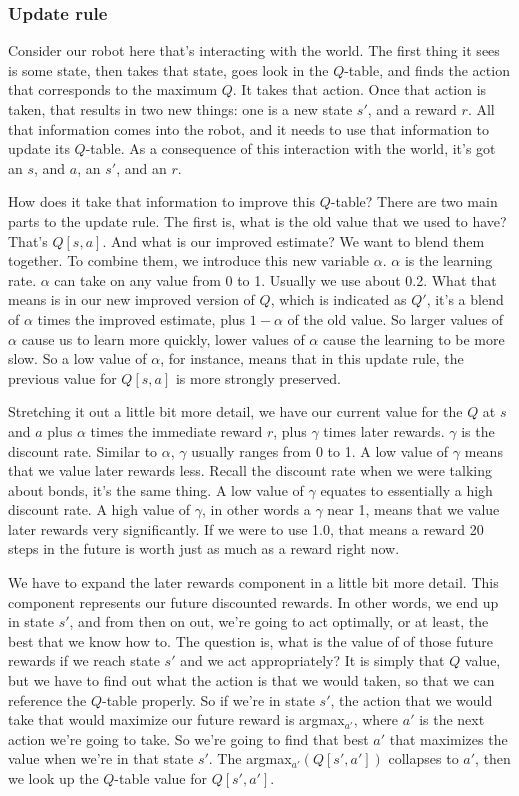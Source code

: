 \documentclass[12pt]{article}
\begin{document}
\subsubsection{Update rule}

Consider our robot here that's interacting with the world. The first thing it sees is some state, then takes that state, goes look in the $Q$-table, and finds the action that corresponds to the maximum $Q$. It takes that action. Once that action is taken, that results in two new things: one is a new state $s'$, and a reward $r$. All that information comes into the robot, and it needs to use that information to update its $Q$-table. As a consequence of this interaction with the world, it's got an $s$, and $a$, an $s'$, and an $r$.

How does it take that information to improve this $Q$-table? There are two main parts to the update rule. The first is, what is the old value that we used to have? That's $Q[s, a]$. And what is our improved estimate? We want to blend them together. To combine them, we introduce this new variable $\alpha$. $\alpha$ is the learning rate. $\alpha$ can take on any value from 0 to 1. Usually we use about 0.2. What that means is in our new improved version of $Q$, which is indicated as $Q'$, it's a blend of $\alpha$ times the improved estimate, plus $1-\alpha$ of the old value. So larger values of $\alpha$ cause us to learn more quickly, lower values of $\alpha$ cause the learning to be more slow. So a low value of $\alpha$, for instance, means that in this update rule, the previous value for $Q[s, a]$ is more strongly preserved. 

Stretching it out a little bit more detail, we have our current value for the $Q$ at $s$ and $a$ plus $\alpha$ times the immediate reward $r$, plus $\gamma$ times later rewards. $\gamma$ is the discount rate. Similar to $\alpha$, $\gamma$ usually ranges from 0 to 1. A low value of $\gamma$ means that we value later rewards less. Recall the discount rate when we were talking about bonds, it's the same thing. A low value of $\gamma$ equates to essentially a high discount rate. A high value of $\gamma$, in other words a $\gamma$ near 1, means that we value later rewards very significantly. If we were to use 1.0, that means a reward 20 steps in the future is worth just as much as a reward right now. 

We have to expand the later rewards component in a little bit more detail. This component represents our future discounted rewards. In other words, we end up in state $s'$, and from then on out, we're going to act optimally, or at least, the best that we know how to. The question is, what is the value of of those future rewards if we reach state $s'$ and we act appropriately? It is simply that $Q$ value, but we have to find out what the action is that we would taken, so that we can reference the $Q$-table properly. So if we're in state $s'$, the action that we would take that would maximize our future reward is argmax$_{a'}$, where $a'$ is the next action we're going to take. So we're going to find that best $a'$ that maximizes the value when we're in that state $s'$. The argmax$_{a'}(Q[s', a'])$ collapses to $a'$, then we look up the $Q$-table value for $Q[s', a']$.
\end{document}

